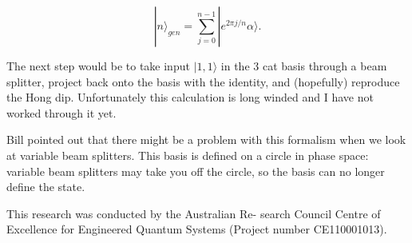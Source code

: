 \documentclass[twocolumn,prl]{revtex4}
\begin{document}
\begin{equation}
|n\rangle_{gen}=\sum_{j=0}^{n-1} |e^{2\pi j/n}\alpha\rangle.
\end{equation}

The next step would be to take input $|1,1\rangle$ in the 3 cat basis through a beam splitter, project back onto the basis with the identity, and (hopefully) reproduce the Hong dip. Unfortunately this calculation is long winded and I have not worked through it yet.

Bill pointed out that there might be a problem with this formalism when we look at variable beam splitters. This basis is defined on a circle in phase space: variable beam splitters may take you off the circle, so the basis can no longer define the state.




This research was conducted by the Australian Re- search Council Centre of Excellence for Engineered Quantum Systems (Project number CE110001013).
\end{document}
